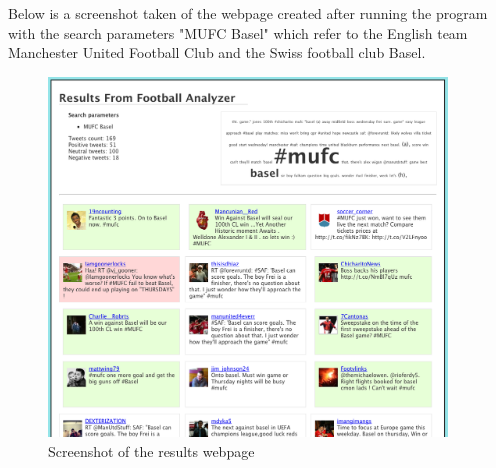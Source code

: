 Below is a screenshot taken of the webpage created after running the program with the search parameters "MUFC Basel" which refer to the English team Manchester United Football Club and the Swiss football club Basel. \\

\begin{figure}[h]
	\centering
		\includegraphics[width=400px]{images/webpage.png}
	\caption{ Screenshot of the results webpage }
	\label{fig:results}
\end{figure}

